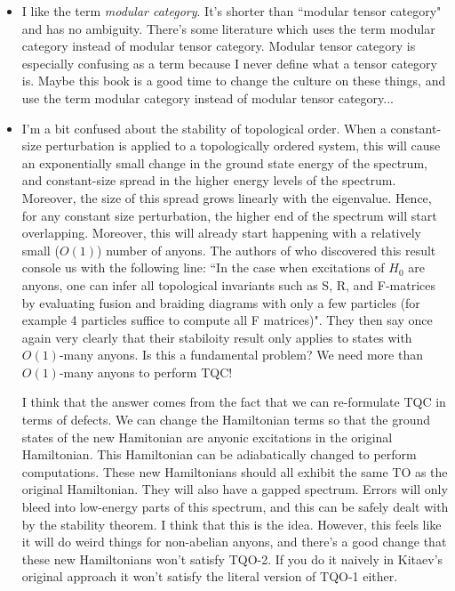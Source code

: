 \documentclass{article}
\theoremstyle{definition}
\newcommand{\0}{\left|0\right>}
\newcommand{\1}{\left|1\right>}
\numberwithin{figure}{section}
\begin{document}
\begin{itemize}
\item I like the term \textit{modular category}. It's shorter than ``modular tensor category" and has no ambiguity. There's some literature which uses the term modular category instead of modular tensor category. Modular tensor category is especially confusing as a term because I never define what a tensor category is. Maybe this book is a good time to change the culture on these things, and use the term modular category instead of modular tensor category...

\item I'm a bit confused about the stability of topological order. When a constant-size perturbation is applied to a topologically ordered system, this will cause an exponentially small change in the ground state energy of the spectrum, and constant-size spread in the higher energy levels of the spectrum. Moreover, the size of this spread grows linearly with the eigenvalue. Hence, for any constant size perturbation, the higher end of the spectrum will start overlapping. Moreover, this will already start happening with a relatively small ($O(1)$) number of anyons. The authors of \cite{bravyi2010topological} who discovered this result console us with the following line: ``In the case when excitations of $H_0$ are anyons, one can infer all topological invariants such
as S, R, and F-matrices by evaluating fusion and braiding diagrams with only a few particles
(for example 4 particles suffice to compute all F matrices)". They then say once again very clearly that their stabiloity result only applies to states with $O(1)$-many anyons. Is this a fundamental problem? We need more than $O(1)$-many anyons to perform TQC!

I think that the answer comes from the fact that we can re-formulate TQC in terms of defects. We can change the Hamiltonian terms so that the ground states of the new Hamitonian are anyonic excitations in the original Hamiltonian. This Hamiltonian can be adiabatically changed to perform computations. These new Hamiltonians should all exhibit the same TO as the original Hamiltonian. They will also have a gapped spectrum. Errors will only bleed into low-energy parts of this spectrum, and this can be safely dealt with by the stability theorem. I think that this is the idea. However, this feels like it will do weird things for non-abelian anyons, and there's a good change that these new Hamiltonians won't satisfy TQO-2. If you do it naively in Kitaev's original approach it won't satisfy the literal version of TQO-1 either.


\end{itemize}
\end{document}
